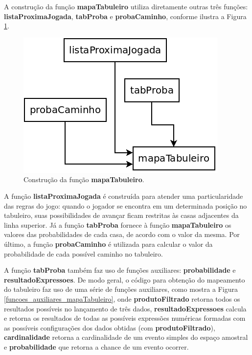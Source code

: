 \documentclass[12pt]{article}
\begin{document}
A construção da função \textbf{mapaTabuleiro} utiliza diretamente outras três funções: \textbf{listaProximaJogada}, \textbf{tabProba} e \textbf{probaCaminho}, conforme ilustra a Figura \ref{construcao_mapaTabuleiro}.

\begin{figure}[ht!]
	\centering
	\includegraphics[width=0.45\linewidth]{img/construcao_mapaTabuleiro.png}
	\caption{Construção da função \textbf{mapaTabuleiro}.}
	\label{construcao_mapaTabuleiro}
\end{figure}

A função \textbf{listaProximaJogada} é construída para atender uma particularidade das regras do jogo: quando o jogador se encontra em um determinada posição no tabuleiro, suas possibilidades de avançar ficam restritas às casas adjacentes da linha superior. Já a função \textbf{tabProba} fornece à função \textbf{mapaTabuleiro} os valores das probabilidades de cada casa, de acordo com o valor da mesma. Por último, a função \textbf{probaCaminho} é utilizada para calcular o valor da probabilidade de cada possível caminho no tabuleiro.

A função \textbf{tabProba} também faz uso de funções auxiliares: \textbf{probabilidade} e \textbf{resultadoExpressoes}. De modo geral, o código para obtenção do mapeamento do tabuleiro faz uso de uma série de funções auxiliares, como mostra a Figura \ref{funcoes_auxiliares_mapaTabuleiro}, onde \textbf{produtoFiltrado} retorna todos os resultados possíveis no lançamento de três dados, \textbf{resultadoExpressoes} calcula e retorna os resultados de todas as possíveis expressões numéricas formadas com as possíveis configurações dos dados obtidas (com \textbf{produtoFiltrado}), \textbf{cardinalidade} retorna a cardinalidade de um evento simples do espaço amostral e \textbf{probabilidade} que retorna a chance de um evento ocorrer.
\end{document}
